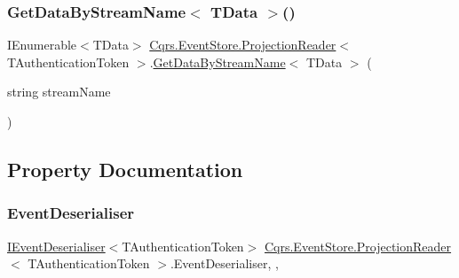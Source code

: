 \mbox{\label{classCqrs_1_1EventStore_1_1ProjectionReader_adb256fc2c761a0add40c84fe2c1cb6e8}} 
\subsubsection{\texorpdfstring{Get\+Data\+By\+Stream\+Name$<$ T\+Data $>$()}{GetDataByStreamName< TData >()}}
{\footnotesize\ttfamily I\+Enumerable$<$T\+Data$>$ \hyperlink{classCqrs_1_1EventStore_1_1ProjectionReader}{Cqrs.\+Event\+Store.\+Projection\+Reader}$<$ T\+Authentication\+Token $>$.\hyperlink{classCqrs_1_1EventStore_1_1ProjectionReader_adcc229abde429acfa6b125b3a93a85b4}{Get\+Data\+By\+Stream\+Name}$<$ T\+Data $>$ (\begin{DoxyParamCaption}\item[{string}]{stream\+Name }\end{DoxyParamCaption})\hspace{0.3cm}{\ttfamily [protected]}}



\subsection{Property Documentation}
\mbox{\label{classCqrs_1_1EventStore_1_1ProjectionReader_a2c7ada08a9525c161eb7e42e2dbf55e0}} 
\subsubsection{\texorpdfstring{Event\+Deserialiser}{EventDeserialiser}}
{\footnotesize\ttfamily \hyperlink{interfaceCqrs_1_1EventStore_1_1IEventDeserialiser}{I\+Event\+Deserialiser}$<$T\+Authentication\+Token$>$ \hyperlink{classCqrs_1_1EventStore_1_1ProjectionReader}{Cqrs.\+Event\+Store.\+Projection\+Reader}$<$ T\+Authentication\+Token $>$.Event\+Deserialiser\hspace{0.3cm}{\ttfamily [get]}, {\ttfamily [set]}, {\ttfamily [protected]}}


